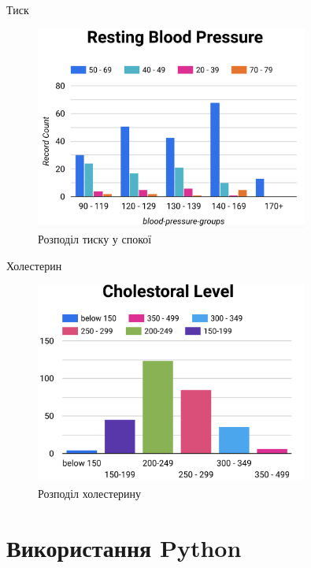 \documentclass{beamer}
\begin{document}
    \begin{frame}{Тиск}
        \begin{figure}
            \centering
            \includegraphics[width=0.8\textwidth]{images/resting_bp.png}
            \caption{Розподіл тиску у спокої}
        \end{figure}
    \end{frame}

    \begin{frame}{Холестерин}
        \begin{figure}
            \centering
            \includegraphics[width=0.8\textwidth]{images/cholestoral.png}
            \caption{Розподіл холестерину}
        \end{figure}
    \end{frame}

    \section{Використання Python}
\end{document}
